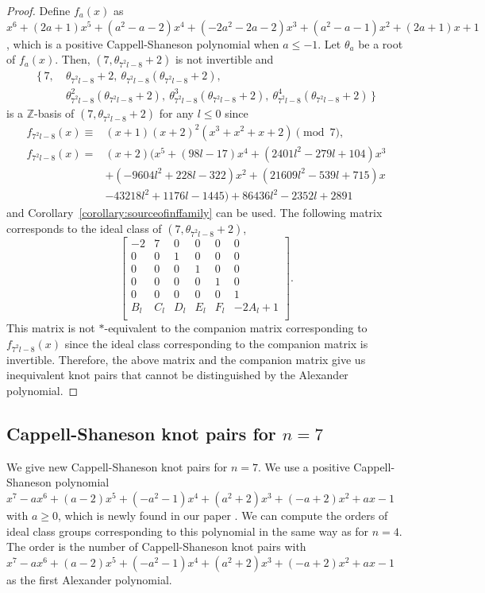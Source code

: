 \documentclass[12pt]{amsart}
\theoremstyle{plain}
\theoremstyle{definition}
\theoremstyle{remark}
\renewcommand{\(}{\big(}
\renewcommand{\)}{\big)}
\theoremstyle{plain}
\theoremstyle{definition}
\begin{document}
\begin{proof}
    Define $f_a(x)$ as $x^6+(2a+1)x^5+(a^2-a-2)x^4+(-2a^2-2a-2)x^3+(a^2-a-1)x^2+(2a+1)x+1$, which is a positive Cappell-Shaneson polynomial when $a \le -1$. Let $\theta_a$ be a root of $f_a(x)$. Then, $(7, \theta_{7^2l-8} + 2)$ is not invertible and 
    \[
    \begin{aligned}
    \{\, 7, \ &\theta_{7^2l-8} + 2, \ \theta_{7^2l-8} ( \theta_{7^2l-8} + 2), \\ &\theta_{7^2l-8}^2 (\theta_{7^2l-8} + 2), \ \theta_{7^2l-8}^3 (\theta_{7^2l-8} + 2),\ \theta_{7^2l-8}^4 (\theta_{7^2l-8} + 2)\, \}
    \end{aligned}
    \]
    is a $\mathbb{Z}$-basis of $(7, \theta_{7^2l-8} + 2)$ for any $l \le 0$ since
    \begin{align*}
        f_{7^2l-8}(x)\equiv&(x+1)(x+2)^2(x^3+x^2+x+2) \pmod {7} ,\\
        f_{7^2l-8}(x) =&(x+2)(x^5+(98l-17)x^4+(2401l^2-279l+104)x^3\\
                        &+(-9604l^2+228l-322)x^2+(21609l^2-539l+715)x\\
                        &-43218l^2+1176l-1445)+86436l^2-2352l+2891
    \end{align*}
    and Corollary~\ref{corollary:sourceofinffamily} can be used. The following matrix corresponds to the ideal class of $(7, \theta_{7^2l-8} + 2)$,
    \[
        \begin{bmatrix}
    	    -2 & 7 & 0 & 0 & 0 & 0\\
            0 & 0 & 1 & 0 & 0 & 0\\
            0 & 0 & 0 & 1 & 0 & 0\\
            0 & 0 & 0 & 0 & 1 & 0\\
            0 & 0 & 0 & 0 & 0 & 1\\
            B_l & C_l & D_l & E_l & F_l & -2A_l+1\\
    		\end{bmatrix}.
    \]
    This matrix is not $*$-equivalent to the companion matrix corresponding to $f_{7^2l-8}(x)$ since the ideal class corresponding to the companion matrix is invertible. Therefore, the above matrix and the companion matrix give us inequivalent knot pairs that cannot be distinguished by the Alexander polynomial.
\end{proof}

\subsection{Cappell-Shaneson knot pairs for \texorpdfstring{$n=7$}{n=7}}
    We give new Cappell-Shaneson knot pairs for $n=7$. We use a positive Cappell-Shaneson polynomial $x^7-ax^6+(a-2)x^5+(-a^2-1)x^4+(a^2+2)x^3+(-a+2)x^2+ax-1$ with $a \ge 0$, which is newly found in our paper \cite{Endo-Iwaki-Pajitnov:2025}. We can compute the orders of ideal class groups corresponding to this polynomial in the same way as for $n=4$. The order is the number of Cappell-Shaneson knot pairs with $x^7-ax^6+(a-2)x^5+(-a^2-1)x^4+(a^2+2)x^3+(-a+2)x^2+ax-1$ as the first Alexander polynomial.
\end{document}
